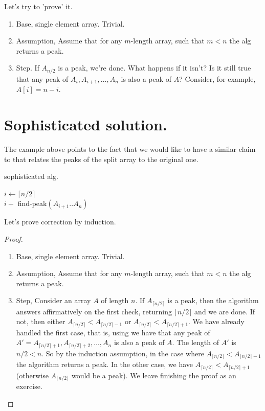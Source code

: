 Let's try to 'prove' it.  
\begin{enumerate}
 \item Base, single element array. Trivial. 
  \item Assumption, Assume that for any $m$-length array, such that $m<n$ the alg returns a peak. 
  \item Step. If $A_{n/2}$ is a peak, we're done. What happens if it isn't? Is it still true that any peak of $A_{i},A_{i+1}, \ldots, A_{n}$ is also a peak of $A$? Consider, for example, $A[i] = n - i$.
\end{enumerate}

\section{Sophisticated solution.}
The example above points to the fact that we would like to have a similar claim to  that relates the peaks of the split array to the original one.  
\begin{algorithm}
\caption{sophisticated alg.}
$ i \leftarrow  \lceil n/2 \rceil $\\
         { 
          \Return $i + $ find-peak$\left(A_{i+1}..A_{n}\right)$
        }
\end{algorithm}
Let's prove correction by induction.
\begin{proof}
\begin{enumerate}
  \item Base, single element array. Trivial. 
  \item Assumption, Assume that for any $m$-length array, such that $m<n$ the alg returns a peak. 
  \item Step, Consider an array $A$ of length $n$. If $A_{\lceil n/2 \rceil}$ is a peak, then the algorithm answers affirmatively on the first check, returning $\lceil n/2 \rceil$ and we are done. If not, then either $A_{\lceil n/2 \rceil} < A_{\lceil n/2 \rceil - 1}$ or $A_{\lceil n/2 \rceil} < A_{\lceil n/2 \rceil + 1}$. We have already handled the first case, that is, using  we have that any peak of $A' = A_{\lceil n/2 \rceil + 1}, A_{\lceil n/2 \rceil + 2}, \dots, A_n$ is also a peak of $A$. The length of $A'$ is $n/2 < n$. So by the induction assumption, in the case where $A_{\lceil n/2 \rceil} < A_{\lceil n/2 \rceil - 1}$ the algorithm returns a peak. In the other case, we have $A_{\lceil n/2 \rceil} < A_{\lceil n/2 \rceil + 1}$ (otherwise $A_{\lceil n/2 \rceil}$ would be a peak). We leave finishing the proof as an exercise.
\end{enumerate}

\end{proof}


